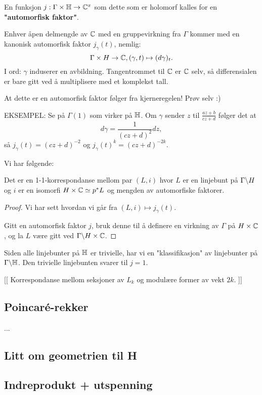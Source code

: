 \documentclass[11pt, english]{article}
\begin{document}
En funksjon $j:\Gamma \times \mathbb{H} \to \mathbb{C}^x$ som dette som er holomorf kalles for en \textbf{"automorfisk faktor"}.

\begin{example}
Enhver åpen delmengde av $\mathbb{C}$ med en gruppevirkning fra $\Gamma$ kommer med en kanonisk automorfisk faktor $j_\gamma(t)$, nemlig:
\[
\Gamma \times H \to \mathbb{C}, (\gamma, t) \mapsto (d\gamma)_t.
\]
I ord: $\gamma$ induserer en avbildning. Tangentrommet til $\mathbb{C}$ er $\mathbb{C}$ selv, så differensialen er bare gitt ved å multiplisere med et komplekst tall. 

At dette er en automorfisk faktor følger fra kjerneregelen! Prøv selv :)

EKSEMPEL: Se på $\Gamma(1)$ som virker på $\mathbb{H}$. Om $\gamma$ sender $z$ til $\frac{az+b}{cz+d}$ følger det at 
$$
d\gamma = \frac{1}{(cz+d)^2} dz,
$$
så $j_\gamma(t)= (cz+d)^{-2}$ og $j_\gamma(t)^k= (cz+d)^{-2k}$. 
\end{example}

Vi har følgende:
\begin{prop}
Det er en 1-1-korrespondanse mellom par $(L,i)$ hvor $L$ er en linjebunt på $\Gamma \backslash H$ og $i$ er en isomorfi $H \times \mathbb{C} \simeq p^\ast L$ og mengden av automorfiske faktorer.
\end{prop}
\begin{proof}
Vi har sett hvordan vi går fra $(L,i) \mapsto j_\gamma(t)$. 

Gitt en automorfisk faktor $j$, bruk denne til å definere en virkning av $\Gamma$ på $H \times \mathbb{C}$, og la $L$ være gitt ved $\Gamma \backslash H \times \mathbb{C}$.
\end{proof}

Siden alle linjebunter på $\mathbb{H}$ er trivielle, har vi en "klassifikasjon" av linjebunter på $\Gamma \backslash \mathbb{H}$. Den trivielle linjebunten svarer til $j=1$. 


[[
Korrespondanse mellom seksjoner av $L_k$ og modulære former av vekt $2k$.
]]

\subsection{Poincaré-rekker}

...

\subsection{Litt om geometrien til H}


\subsection{Indreprodukt + utspenning}
\end{document}
